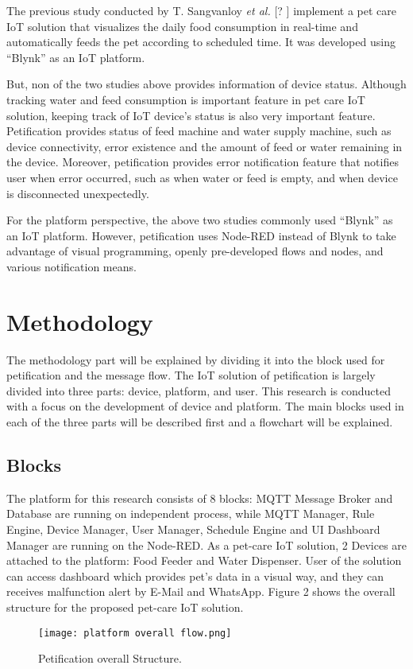 \documentclass[conference]{IEEEtran}
\begin{document}
The previous study conducted by T. Sangvanloy \textit{et al.} [?
] 
implement a pet care IoT solution that visualizes the daily food consumption in real-time and automatically feeds the pet according to scheduled time. It was developed using “Blynk” as an IoT platform.

But, non of the two studies above provides information of device status. Although tracking water and feed consumption is important feature in pet care IoT solution, keeping track of IoT device’s status is also very important feature. Petification provides status of feed machine and water supply machine, such as device connectivity, error existence and the amount of feed or water remaining in the device. Moreover, petification provides error notification feature that notifies user when error occurred, such as when water or feed is empty, and when device is disconnected unexpectedly.

For the platform perspective, the above two studies commonly used “Blynk” as an IoT platform. However, petification uses Node-RED instead of Blynk to take advantage of visual programming, openly pre-developed flows and nodes, and various notification means.

\section{Methodology}
The methodology part will be explained by dividing it into the block used for petification and the message flow. The IoT solution of petification is largely divided into three parts: device, platform, and user. This research is conducted with a focus on the development of device and platform. The main blocks used in each of the three parts will be described first and a flowchart will be explained.

\subsection{Blocks}
The platform for this research consists of 8 blocks: MQTT Message Broker and Database are running on independent process, while MQTT Manager, Rule Engine, Device Manager, User Manager, Schedule Engine and UI Dashboard Manager are running on the Node-RED. As a pet-care IoT solution, 2 Devices are attached to the platform: Food Feeder and Water Dispenser. User of the solution can access dashboard which provides pet’s data in a visual way, and they can receives malfunction alert by E-Mail and WhatsApp. Figure 2 shows the overall structure for the proposed pet-care IoT solution.
\begin{figure}[htbp]

\centerline{\texttt{[image: platform overall flow.png]}}
\caption{Petification overall Structure.}
\label{fig}
\end{figure}
\end{document}
